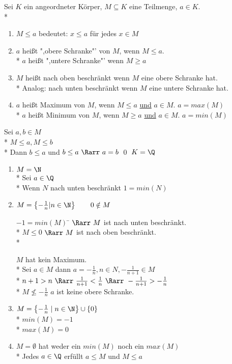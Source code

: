 	Sei $K$ ein angeordneter Körper, $M \subseteq K$ eine Teilmenge, $a \in K$.\\*
	\begin{enumerate}
	\item{$M \leq a$ bedeutet: $x \leq a$ für jedes $x \in M$}
	\item{$a$ heißt ",obere Schranke"' von $M$, wenn $M \leq a$.\\*
		$a$ heißt ",untere Schranke"' wenn $M \geq a$}
	\item{$M$ heißt nach oben beschränkt wenn $M$ eine obere Schranke hat.\\*
	Analog: nach unten beschränkt wenn $M$ eine untere Schranke hat.}
	\item{$a$ heißt Maximum von $M$, wenn $M \leq a$ \ul{und} $a \in M$. $a = max(M)$\\*
		$a$ heißt Minimum von $M$, wenn $M \geq a$ \ul{und} $a \in M$. $a = min(M)$}
	\end{enumerate}
\bew
	Sei $a, b \in M$\\*
	$M \leq a, M \leq b$\\*
	Dann $b \leq a$ und $b \leq a\ \Rarr\ a = b$ \qed
\bsp
	$K = \Q$
	\begin{enumerate}
	\item{$M = \N$\\*
	Sei $a \in \Q$\\*
	Wenn $N$ nach unten beschränkt $1 = min(N)$}
	\item{$M = \left\lbrace -\frac{1}{n} | n \in \N \right\rbrace \qquad 0 \notin M$
	\begin{tabbing}
	$-1 = min(M)$ \= $\Rarr\ M$ ist nach unten beschränkt.\\*
	$M \leq 0$	\> $\Rarr\ M$ ist nach oben beschränkt.\\*
	\end{tabbing}
	$M$ hat kein Maximum.\\*
	Sei $a \in M$ dann $a = -\frac{1}{n}, n \in N, -\frac{1}{n + 1} \in M$\\*
	$n + 1 > n\ \Rarr\ \frac{1}{n + 1} < \frac{1}{n}\ \Rarr\ -\frac{1}{n + 1} > -\frac{1}{n}$\\*
	$M \nleq -\frac{1}{n}$ $a$ ist keine obere Schranke.}
	\item{$M = \left\lbrace -\frac{1}{n} \mid n \in \N\right\rbrace \cup \{ 0 \}$\\*
	$min(M) = -1$\\*
	$max(M) = 0$}
	\item{$M = \emptyset$ hat weder ein $min(M)$ noch ein $max(M)$\\*
	Jedes $a \in \Q$ erfüllt $a \leq M$ und $M \leq a$}
	\end{enumerate}

